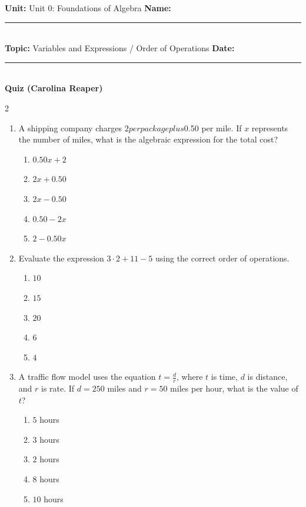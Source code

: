 \documentclass[10pt]{article}
\begin{document}
\enlargethispage{2.5cm}

\begin{tcolorbox}[colback=mainblue!5, colframe=mainblue, sharp corners, boxrule=0.5pt]
    \small \textbf{Unit:} Unit 0: Foundations of Algebra \hfill \textbf{Name:} \rule{3cm}{0.4pt} \\
    \small \textbf{Topic:} Variables and Expressions / Order of Operations \hfill \textbf{Date:} \rule{2cm}{0.4pt} \\
    \centering \textbf{\large Quiz (Carolina Reaper)}
\end{tcolorbox}

\vspace{0.2cm}

\begin{multicols}{2}
\begin{enumerate}[label=\textbf{Q\arabic*.}, leftmargin=*, itemsep=6pt, parsep=0pt]

  \item \small A shipping company charges $2 per package plus $0.50 per mile. If $x$ represents the number of miles, what is the algebraic expression for the total cost?
  \begin{enumerate}[label=(\Alph*), leftmargin=0.6cm, nosep, itemsep=2pt]
    \item $0.50x + 2$
    \item $2x + 0.50$
    \item $2x - 0.50$
    \item $0.50 - 2x$
    \item $2 - 0.50x$
  \end{enumerate}

  \item \small Evaluate the expression $3 \cdot 2 + 11 - 5$ using the correct order of operations.
  \begin{enumerate}[label=(\Alph*), leftmargin=0.6cm, nosep, itemsep=2pt]
    \item $10$
    \item $15$
    \item $20$
    \item $6$
    \item $4$
  \end{enumerate}

  \item \small A traffic flow model uses the equation $t = \frac{d}{r}$, where $t$ is time, $d$ is distance, and $r$ is rate. If $d = 250$ miles and $r = 50$ miles per hour, what is the value of $t$?
  \begin{enumerate}[label=(\Alph*), leftmargin=0.6cm, nosep, itemsep=2pt]
    \item $5$ hours
    \item $3$ hours
    \item $2$ hours
    \item $8$ hours
    \item $10$ hours
  \end{enumerate}


\end{enumerate}
\end{multicols}
\end{document}

